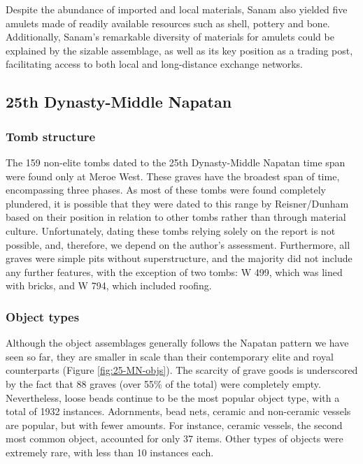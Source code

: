 Despite the abundance of imported and local materials, Sanam also yielded five amulets made of readily available resources such as shell, pottery and bone. Additionally, Sanam's remarkable diversity of materials for amulets could be explained by the sizable assemblage, as well as its key position as a trading post, facilitating access to both local and long-distance exchange networks.


\subsection{25th Dynasty-Middle Napatan}


\subsubsection{Tomb structure}


The 159 non-elite tombs dated to the 25th Dynasty-Middle Napatan time span were found only at Meroe West. These graves have the broadest span of time, encompassing three phases. As most of these tombs were found completely plundered, it is possible that they were dated to this range by Reisner/Dunham based on their position in relation to other tombs rather than through material culture. Unfortunately, dating these tombs relying solely on the report is not possible, and, therefore, we depend on the author's assessment. Furthermore, all graves were simple pits without superstructure, and the majority did not include any further features, with the exception of two tombs: W 499, which was lined with bricks, and W 794, which included roofing.


\subsubsection{Object types}


Although the object assemblages generally follows the Napatan pattern we have seen so far, they are smaller in scale than their contemporary elite and royal counterparts (Figure \ref{fig:25-MN-objs}). The scarcity of grave goods is underscored by the fact that 88 graves (over 55\% of the total) were completely empty. Nevertheless, loose beads continue to be the most popular object type, with a total of 1932 instances. Adornments, bead nets, ceramic and non-ceramic vessels are popular, but with fewer amounts. For instance, ceramic vessels, the second most common object, accounted for only 37 items. Other types of objects were extremely rare, with less than 10 instances each.


